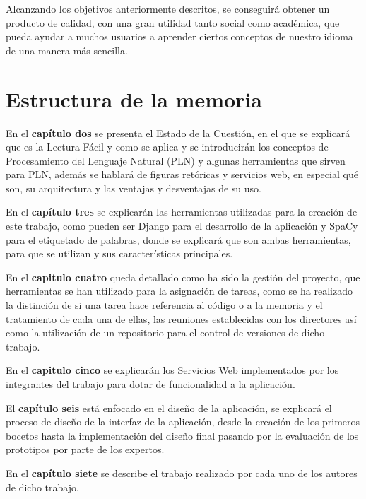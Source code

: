 Alcanzando los objetivos anteriormente descritos, se conseguirá obtener un producto de calidad, con una gran utilidad tanto social como académica, que pueda ayudar a muchos usuarios a aprender ciertos conceptos de nuestro idioma de una manera más sencilla.
	
	
\section{Estructura de la memoria}
\label{cap:sec:estructuramemoria}


En el \textbf{capítulo dos} se presenta el Estado de la Cuestión, en el que se explicará que es la Lectura Fácil y como se aplica y se introducirán los conceptos de Procesamiento del Lenguaje Natural (PLN) y algunas herramientas que sirven para PLN, además se hablará de figuras retóricas y servicios web, en especial qué son, su arquitectura y las ventajas y desventajas de su uso.


En el \textbf{capítulo tres} se explicarán las herramientas utilizadas para la creación de este trabajo, como pueden ser Django para el desarrollo de la aplicación y SpaCy para el etiquetado de palabras, donde se explicará que son ambas herramientas, para que se utilizan y sus características principales.

En el \textbf{capitulo cuatro} queda detallado como ha sido la gestión del proyecto, que herramientas se han utilizado para la asignación de tareas, como se ha realizado la distinción de si una tarea hace referencia al código o a la memoria y el tratamiento de cada una de ellas, las reuniones establecidas con los directores así como la utilización de un repositorio para el control de versiones de dicho trabajo.

En el \textbf{capitulo cinco} se explicarán los Servicios Web implementados por los integrantes del trabajo para dotar de funcionalidad a la aplicación.

El \textbf{capítulo seis} está enfocado en el diseño de la aplicación, se explicará el proceso de diseño de la interfaz de la aplicación, desde la creación de los primeros bocetos hasta la implementación del diseño final pasando por la evaluación de los prototipos por parte de los expertos.
 
En el \textbf{capítulo siete} se describe el trabajo realizado por cada uno de los autores de dicho trabajo.
